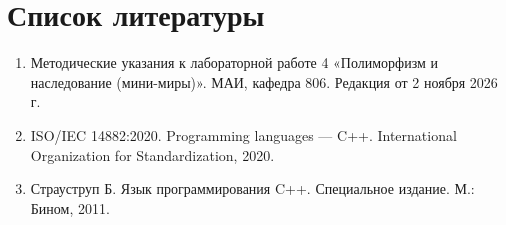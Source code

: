 \section{Список литературы}
\begin{enumerate}
\item Методические указания к лабораторной работе 4 «Полиморфизм и наследование (мини-миры)». МАИ, кафедра 806. Редакция от 2 ноября 2026 г.
\item ISO/IEC 14882:2020. Programming languages --- C++. International Organization for Standardization, 2020.
\item Страуструп Б. Язык программирования C++. Специальное издание. М.: Бином, 2011.
\end{enumerate}
